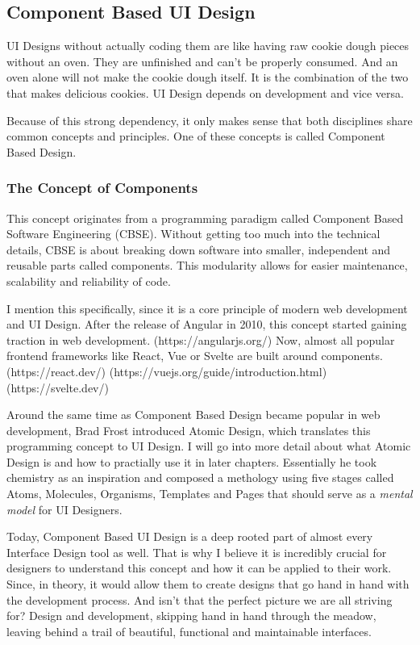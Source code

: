 \subsection{Component Based UI Design}
UI Designs without actually coding them are like having raw cookie dough pieces without an oven.
They are unfinished and can't be properly consumed. And an oven alone will not make the cookie dough
itself. It is the combination of the two that makes delicious cookies. UI Design depends on
development and vice versa.

Because of this strong dependency, it only makes sense that both disciplines share common concepts
and principles. One of these concepts is called Component Based Design.

\subsubsection{The Concept of Components}
This concept originates from a programming paradigm called Component Based Software Engineering
(CBSE). Without getting too much into the technical details, CBSE is about breaking down software
into smaller, independent and reusable parts called components. This modularity allows for easier
maintenance, scalability and reliability of code.

I mention this specifically, since it is a core principle of modern web development and UI Design.
After the release of Angular in 2010, this concept started gaining traction in web development.
(https://angularjs.org/)
Now, almost all popular frontend frameworks like React, Vue or Svelte are built around components.
(https://react.dev/) (https://vuejs.org/guide/introduction.html) (https://svelte.dev/)

Around the same time as Component Based Design became popular in web development, Brad Frost
introduced Atomic Design, which translates this programming concept to UI Design. I will go into
more detail about what Atomic Design is and how to practially use it in later chapters. Essentially
he took chemistry as an inspiration and composed a methology using five stages called Atoms,
Molecules, Organisms, Templates and Pages that should serve as a \textit{mental model} for UI
Designers. 

Today, Component Based UI Design is a deep rooted part of almost every Interface Design tool as
well. That is why I believe it is incredibly crucial for designers to understand this concept and
how it can be applied to their work. Since, in theory, it would allow them to create designs that go
hand in hand with the development process. And isn't that the perfect picture we are all striving
for? Design and development, skipping hand in hand through the meadow, leaving behind a trail of
beautiful, functional and maintainable interfaces.

